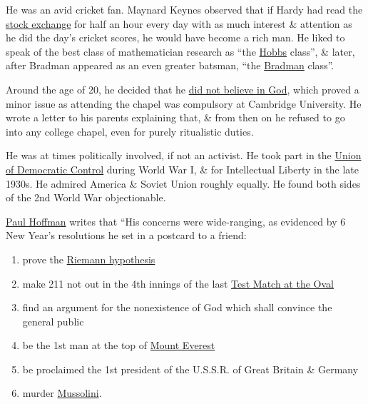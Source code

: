 \documentclass{article}
\begin{document}
He was an avid cricket fan. {\sc Maynard Keynes} observed that if {\sc Hardy} had read the \href{https://en.wikipedia.org/wiki/Stock_exchange}{stock exchange} for half an hour every day with as much interest \& attention as he did the day's cricket scores, he would have become a rich man. He liked to speak of the best class of mathematician research as ``the \href{https://en.wikipedia.org/wiki/Jack_Hobbs}{Hobbs} class'', \& later, after Bradman appeared as an even greater batsman, ``the \href{https://en.wikipedia.org/wiki/Don_Bradman}{Bradman} class''.

Around the age of 20, he decided that he \href{https://en.wikipedia.org/wiki/Atheism}{did not believe in God}, which proved a minor issue as attending the chapel was compulsory at Cambridge University. He wrote a letter to his parents explaining that, \& from then on he refused to go into any college chapel, even for purely ritualistic duties.

He was at times politically involved, if not an activist. He took part in the \href{https://en.wikipedia.org/wiki/Union_of_Democratic_Control}{Union of Democratic Control} during World War I, \& for Intellectual Liberty in the late 1930s. He admired America \& Soviet Union roughly equally. He found both sides of the 2nd World War objectionable.

\href{https://en.wikipedia.org/wiki/Paul_Hoffman_(science_writer)}{\sc Paul Hoffman} writes that ``His concerns were wide-ranging, as evidenced by 6 New Year's resolutions he set in a postcard to a friend:
\begin{enumerate}
	\item prove the \href{https://en.wikipedia.org/wiki/Riemann_hypothesis}{Riemann hypothesis}
	\item make 211 not out in the 4th innings of the last \href{https://en.wikipedia.org/wiki/The_Oval}{Test Match at the Oval}
	\item find an argument for the nonexistence of God which shall convince the general public
	\item be the 1st man at the top of \href{https://en.wikipedia.org/wiki/Mount_Everest}{Mount Everest}
	\item be proclaimed the 1st president of the U.S.S.R. of Great Britain \& Germany
	\item murder \href{https://en.wikipedia.org/wiki/Benito_Mussolini}{Mussolini}.
\end{enumerate}
\end{document}
